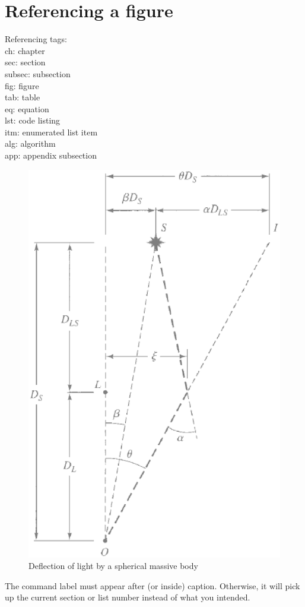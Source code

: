 \documentclass{article}
\title{}
\author{Bhishan Poudel}
\date{\today}
\author{Bhishan Poudel}
\begin{document}
\title{}
\tableofcontents
\listoffigures

\section{Referencing a figure}
Referencing tags: \\
ch: 	chapter \\
sec: 	section\\
subsec: 	subsection\\
fig: 	figure\\
tab: 	table\\
eq: 	equation\\
lst: 	code listing\\
itm: 	enumerated list item\\
alg: 	algorithm\\
app: 	appendix subsection\\

\begin{figure}[ht!]
\centering
\includegraphics[scale = 0.5]{images/fig1.eps}
\caption{Deflection of light by a spherical massive body}
\label{fig:fig1} %
\end{figure}
The command label must appear after (or inside) caption. Otherwise, it will pick up the current section or list number instead of what you intended.
\end{document}
